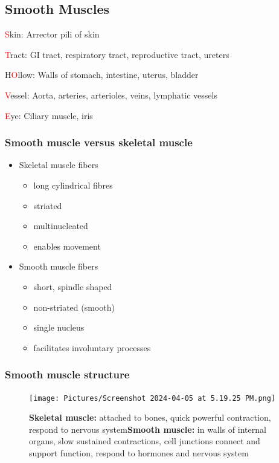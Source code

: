 \documentclass[11pt,fleqn]{book}
\begin{document}
\subsection{Smooth Muscles}
\begin{descriptions}
    \item[\textcolor{red}{S}kin: ]Arrector pili of skin 
    \item[\textcolor{red}{T}ract: ]GI tract, respiratory tract, reproductive tract, ureters
    \item[H\textcolor{red}{O}llow: ]Walls of stomach, intestine, uterus, bladder
    \item[\textcolor{red}{V}essel: ]Aorta, arteries, arterioles, veins, lymphatic vessels
    \item[\textcolor{red}{E}ye: ] Ciliary muscle, iris
\end{descriptions}
\subsubsection{Smooth muscle versus skeletal muscle}
\begin{itemize}
    \item Skeletal muscle fibers
    \begin{itemize}
        \item long cylindrical fibres
        \item striated
        \item multinucleated
        \item enables movement
    \end{itemize}
    \item Smooth muscle fibers
    \begin{itemize}
        \item short, spindle shaped
        \item non-striated (smooth)
        \item single nucleus
        \item facilitates involuntary processes
    \end{itemize}
\end{itemize}

\subsubsection{Smooth muscle structure}
\begin{figure}[h!]
\begin{center}
    \texttt{[image: Pictures/Screenshot 2024-04-05 at 5.19.25 PM.png]}
\end{center}
    \caption{\textbf{Skeletal muscle:} attached to bones, quick powerful contraction, respond to nervous system\textbf{Smooth muscle:} in walls of internal organs, slow sustained contractions, cell junctions connect and support function, respond to hormones and nervous system}
\end{figure}
\end{document}

